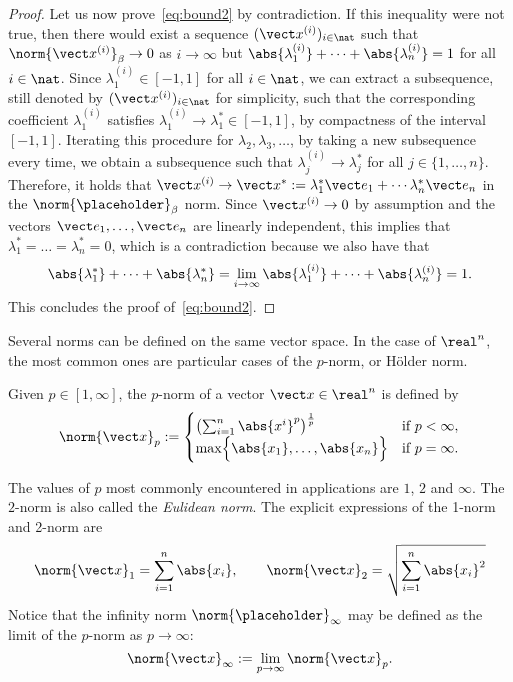 \begin{proof}
    Let us now prove~\eqref{eq:bound2} by contradiction.
    If this inequality were not true,
    then there would exist a sequence $(\vect x^{(i)})_{i \in \nat}$ such
    that~$\norm{\vect x^{(i)}}_{\beta} \to 0$ as $i \to \infty$ but $\abs{\lambda_1^{(i)}} + \dotsb + \abs{\lambda_n^{(i)}} = 1$ for all $i \in \nat$.
    Since $\lambda_1^{(i)} \in [-1, 1]$ for all $i \in \nat$,
    we can extract a subsequence, still denoted by $(\vect x^{(i)})_{i \in \nat}$ for simplicity,
    such that the corresponding coefficient $\lambda_1^{(i)}$ satisfies $\lambda_1^{(i)} \to \lambda_1^* \in [-1, 1]$,
    by compactness of the interval~$[-1, 1]$.
    Iterating this procedure for $\lambda_2, \lambda_3, \dots$,
    by taking a new subsequence every time,
    we obtain a subsequence such that $\lambda^{(i)}_j \to \lambda_j^*$ for all $j \in \{1, \dotsc, n\}$.
    Therefore, it holds that $\vect x^{(i)} \to \vect x^* := \lambda_1^* \vect e_1 + \dotsb \lambda_n^* \vect e_n$ in the $\norm{\placeholder}_{\beta}$ norm.
    Since $\vect x^{(i)} \to 0$ by assumption and the vectors $\vect e_1, \dotsc, \vect e_n$ are linearly independent,
    this implies that $\lambda_1^* = \dots = \lambda_n^* = 0$,
    which is a contradiction because we also have that
    \[
        \abs{\lambda_1^*} + \dotsb + \abs{\lambda_n^*} = \lim_{i \to \infty} \abs{\lambda_1^{(i)}} + \dotsb + \abs{\lambda_n^{(i)}} = 1.
    \]
    This concludes the proof of~\eqref{eq:bound2}.
\end{proof}

Several norms can be defined on the same vector space.
In the case of $\real^n$,
the most common ones are particular cases of the $p$-norm, or H\"older norm.
\begin{definition}
    Given $p \in [1, \infty]$,
    the $p$-norm of a vector $\vect x \in \real^n$ is defined by
    \[
        \norm{\vect x}_p :=
        \begin{cases}
            \left( \sum_{i=1}^{n} \abs{x^i}^p \right)^{\frac{1}{p}} & \text{if $p < \infty$}, \\
            \max \Bigl\{ \abs{x_1}, \dotsc, \abs{x_n} \Bigr\} & \text{if $p = \infty$}.
        \end{cases}
    \]
\end{definition}
The values of $p$ most commonly encountered in applications are $1$, $2$ and $\infty$.
The $2$-norm is also called the \emph{Eulidean norm}.
The explicit expressions of the 1-norm and 2-norm are
\[
    \norm{\vect x}_1 = \sum_{i=1}^{n} \abs{x_i},
    \qquad
    \norm{\vect x}_2 = \sqrt{\sum_{i=1}^{n} \abs{x_i}^2}
\]
Notice that the infinity norm $\norm{\placeholder}_{\infty}$ may be defined as the limit of the $p$-norm as $p \to \infty$:
\[
    \norm{\vect x}_{\infty}
    := \lim_{p \to \infty} \norm{\vect x}_p.
\]

